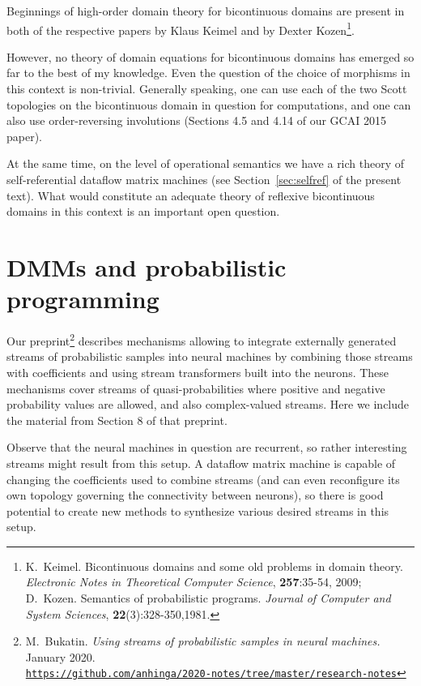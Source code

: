 \documentclass{article}
\begin{document}
Beginnings of high-order domain theory for bicontinuous domains are present in both of the respective papers by Klaus Keimel and by Dexter Kozen\footnote{K.~Keimel. Bicontinuous domains and some old problems in domain theory. {\em Electronic Notes in Theoretical Computer Science}, {\bf 257}:35-54, 2009; D.~Kozen. Semantics of probabilistic programs. {\em Journal of Computer and System Sciences}, {\bf 22}(3):328-350,1981.}.

However, no theory of domain equations for bicontinuous domains has emerged so far to the best of my knowledge.
Even the question of the choice of morphisms in this context is non-trivial. Generally speaking, one can use each of the two Scott topologies
on the bicontinuous domain in question for computations, and one can also use order-reversing involutions (Sections 4.5 and 4.14 of our GCAI 2015 paper).

At the same time, on the level of operational semantics we have a rich theory of self-referential dataflow
matrix machines (see Section~\ref{sec:selfref} of the present text). What would constitute an adequate theory of reflexive bicontinuous domains in this context is an important open question.

\section{DMMs and probabilistic programming}

Our preprint\footnote{M.~Bukatin. {\em Using streams of probabilistic samples in neural machines.} January 2020.\\
\href{https://github.com/anhinga/2020-notes/tree/master/research-notes}{\tt https://github.com/anhinga/2020-notes/tree/master/research-notes}} describes mechanisms allowing to integrate externally generated streams of
probabilistic samples into neural machines by
combining those streams with coefficients and using stream transformers built into the neurons.
These mechanisms cover streams of quasi-probabilities where positive and negative probability values are allowed,
and also complex-valued streams. Here we include the material from Section 8 of that preprint.


Observe that the neural machines in question are recurrent, so rather interesting streams might result from this setup.
A dataflow matrix machine is capable of changing the coefficients used to combine streams (and can even reconfigure its own topology governing the connectivity between neurons),
so there is good potential to create new methods to synthesize various desired streams in this setup.
\end{document}
